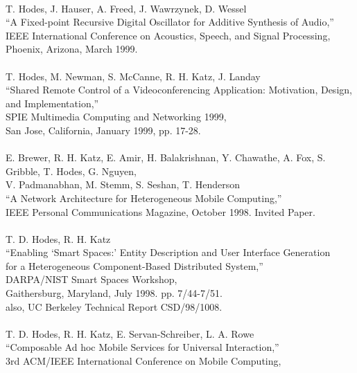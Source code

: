 \begin{tabbing}
\smallskip \\[-3pt]
\>    T. Hodes, J. Hauser, A. Freed, J. Wawrzynek, D. Wessel \\
\>\>      ``A Fixed-point Recursive Digital Oscillator for Additive Synthesis
        of Audio,'' \\
\>\>       IEEE International Conference on Acoustics, Speech, and Signal
            Processing,  \\
\>\>        Phoenix, Arizona, March 1999. \\
\smallskip \\[-3pt]
\>    T. Hodes, M. Newman, S. McCanne, R. H. Katz, J. Landay \\
\>\>      ``Shared Remote Control of a Videoconferencing Application: 
            Motivation, Design, and Implementation,'' \\
\>\>       SPIE Multimedia Computing and Networking 1999,  \\
\>\>        San Jose, California, January 1999, pp. 17-28. \\
\smallskip \\[-3pt]
\>    E. Brewer, R. H. Katz, E. Amir, H. Balakrishnan, Y. Chawathe, A. Fox,
    S. Gribble, T. Hodes, G. Nguyen, \\
\>\>\> V. Padmanabhan, M. Stemm, S. Seshan, T. Henderson \\
\>\>      ``A Network Architecture for Heterogeneous Mobile Computing,'' \\
\>\>       IEEE Personal Communications Magazine, October 1998. Invited Paper. \\
\smallskip \\[-3pt]
\>    T. D. Hodes, R. H. Katz \\
\>\>      ``Enabling `Smart Spaces:' Entity Description and User Interface
        Generation \\
\>\>\>     for a Heterogeneous Component-Based Distributed System,'' \\
\>\>       DARPA/NIST Smart Spaces Workshop,  \\
\>\>       Gaithersburg, Maryland, July 1998.  pp. 7/44-7/51.  \\
\>\>       also, UC Berkeley Technical Report CSD/98/1008. \\
\smallskip \\[-3pt]
\>    T. D. Hodes, R. H. Katz, E. Servan-Schreiber, L. A. Rowe \\
\>\>      ``Composable Ad hoc Mobile Services for Universal Interaction,'' \\
\>\>       3rd ACM/IEEE International Conference on Mobile Computing,  \\

\end{tabbing}

